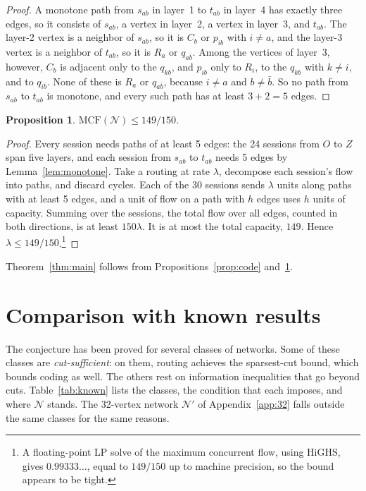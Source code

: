 \documentclass[11pt]{article}
\newtheorem{proposition}[theorem]{Proposition}
\newcommand{\MCF}{\mathrm{MCF}}
\begin{document}
\begin{proof}
A monotone path from $s_{ab}$ in layer~1 to $t_{ab}$ in layer~4 has exactly three edges, so it consists of $s_{ab}$, a vertex in layer~2, a vertex in layer~3, and $t_{ab}$. The layer-2 vertex is a neighbor of $s_{ab}$, so it is $C_b$ or $p_{ib}$ with $i\neq a$, and the layer-3 vertex is a neighbor of $t_{ab}$, so it is $R_a$ or $q_{a\bar b}$. Among the vertices of layer~3, however, $C_b$ is adjacent only to the $q_{kb}$, and $p_{ib}$ only to $R_i$, to the $q_{kb}$ with $k\neq i$, and to $q_{i\bar b}$. None of these is $R_a$ or $q_{a\bar b}$, because $i\neq a$ and $b\neq\bar b$. So no path from $s_{ab}$ to $t_{ab}$ is monotone, and every such path has at least $3+2=5$ edges.
\end{proof}

\begin{proposition}\label{prop:routing}
$\MCF(\mathcal N)\le149/150$.
\end{proposition}

\begin{proof}
Every session needs paths of at least 5 edges: the 24 sessions from $O$ to $Z$ span five layers, and each session from $s_{ab}$ to $t_{ab}$ needs 5 edges by Lemma~\ref{lem:monotone}. Take a routing at rate $\lambda$, decompose each session's flow into paths, and discard cycles. Each of the 30 sessions sends $\lambda$ units along paths with at least 5 edges, and a unit of flow on a path with $h$ edges uses $h$ units of capacity. Summing over the sessions, the total flow over all edges, counted in both directions, is at least $150\lambda$. It is at most the total capacity, $149$. Hence $\lambda\le149/150$.\footnote{A floating-point LP solve of the maximum concurrent flow, using HiGHS, gives $0.99333\ldots$, equal to $149/150$ up to machine precision, so the bound appears to be tight.}
\end{proof}

Theorem~\ref{thm:main} follows from Propositions~\ref{prop:code} and~\ref{prop:routing}.

\section{Comparison with known results}\label{sec:known}

The conjecture has been proved for several classes of networks. Some of these classes are \emph{cut-sufficient}: on them, routing achieves the sparsest-cut bound, which bounds coding as well. The others rest on information inequalities that go beyond cuts. Table~\ref{tab:known} lists the classes, the condition that each imposes, and where $\mathcal N$ stands. The 32-vertex network $\mathcal N'$ of Appendix~\ref{app:32} falls outside the same classes for the same reasons.
\end{document}
